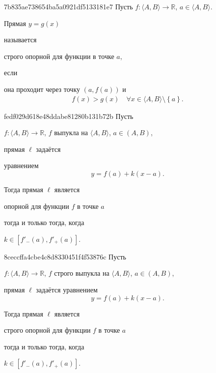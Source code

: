 \begin{note}{7b835ae738654ba5a0921df5133181e7}
    Пусть \( f : \langle A, B \rangle \to \mathbb R  \), \( a \in \langle A, B \rangle  \).
    \begin{icloze}{2}Прямая \( y = g(x) \)\end{icloze} называется \begin{icloze}{1}строго опорной для функции в точке \( a \),\end{icloze} если
    \begin{icloze}{2}
        она проходит через точку \( (a, f(a)) \) и
        \[
            \begin{gathered}
                f(x) > g(x) \quad \forall x \in \langle A, B \rangle \setminus \left\{ a \right\}.
            \end{gathered}
        \]
    \end{icloze}
\end{note}

\begin{note}{fedf029d618e48ddabe81280b131b72b}
    Пусть \begin{icloze}{5}\( f : \langle A, B \rangle \to \mathbb R  \), \( f \) выпукла на \( \langle A, B \rangle  \), \( a \in (A, B) \),\end{icloze} прямая \( \ell \) задаётся
    \begin{icloze}{4}
        уравнением
        \[
            y = f(a) + k(x - a).
        \]
    \end{icloze}

    Тогда прямая \( \ell  \) является \begin{icloze}{1}опорной для функции \( f \)
    в точке \( a \)\end{icloze} \begin{icloze}{3}тогда и только тогда, когда\end{icloze}
    \begin{icloze}{2}
        \( k \in [f'_-(a), f'_+(a)] \).
    \end{icloze}
\end{note}

\begin{note}{8ceccffa4cbe4c8d8330451f4f53876c}
    Пусть \begin{icloze}{4}\( f : \langle A, B \rangle \to \mathbb R  \), \( f \) строго выпукла на \( \langle A, B \rangle  \), \( a \in (A, B) \),\end{icloze} прямая \( \ell \) задаётся уравнением
    \[
        y = f(a) + k(x - a).
    \]

    Тогда прямая \( \ell  \) является \begin{icloze}{1}строго опорной для функции \( f \) в точке \( a \)\end{icloze} \begin{icloze}{3}тогда и только тогда, когда\end{icloze} \begin{icloze}{2}\( k \in [f'_-(a), f'_+(a)]\).\end{icloze}
\end{note}

